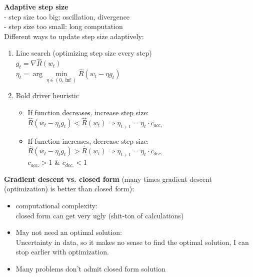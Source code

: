 \documentclass[a4paper, fontsize=8pt, landscape, DIV=1]{scrartcl}
\begin{document}
\begin{multicols*}{4}
		\textbf{Adaptive step size}\\
		- step size too big: oscillation, divergence\\
		- step size too small: long computation\\
		Different ways to update step size adaptively: 
		\begin{enumerate}[noitemsep]
			\item Line search (optimizing step size every step)\\
			$g_t=\nabla\hat{R}(w_t)$\\
			$\eta_t = \arg \min\limits_{\eta\in(0,\inf)}\hat{R}(w_t-\eta g_t)$
			\item Bold driver heuristic
			\begin{itemize}
				\item If function decreases, increase step size:\\
				$\hat{R}(w_t-\eta_t g_t)<\hat{R}(w_t)\Rightarrow \eta_{t+1}=\eta_t\cdot c_{acc.}$ 
				\item If function increases, decrease step size:\\
				$\hat{R}(w_t-\eta_t g_t)>\hat{R}(w_t)\Rightarrow \eta_{t+1}=\eta_t\cdot c_{dec.}$\\
				$c_{acc.}>1$ \& $c_{dec.}<1$
			\end{itemize}
		\end{enumerate}
		\textbf{Gradient descent vs. closed form} (many times gradient descent (optimization) is better than closed form):
		\vspace{-0.2cm} 
		\begin{itemize}[noitemsep]
			\item computational complexity:\\
			 closed form can get very ugly (shit-ton of calculations)
			\item May not need an optimal solution:\\
			Uncertainty in data, so it makes no sense to find the optimal solution, I can stop earlier with optimization.
			\item Many problems don't admit closed form solution
		\end{itemize}
		\columnbreak
		

\end{multicols*}
\end{document}
